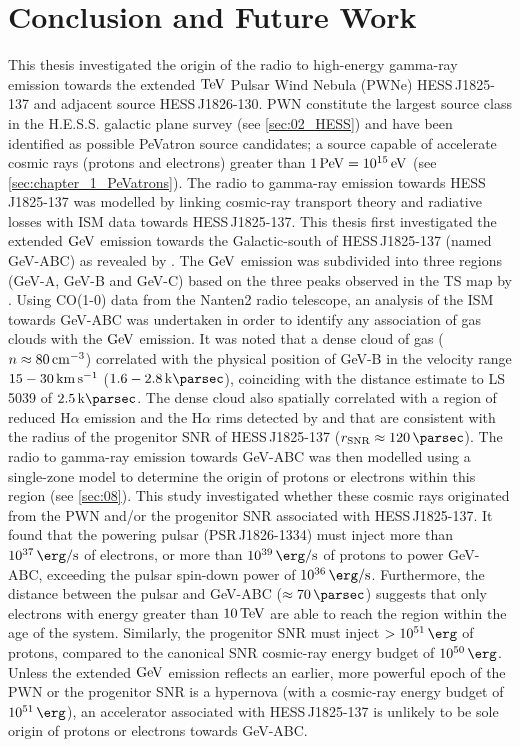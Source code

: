 \chapter{Conclusion and Future Work} \label{sec:10_summary}

This thesis investigated the origin of the radio to high-energy gamma-ray emission towards the extended $\TeV$ Pulsar Wind Nebula (PWNe) \mbox{HESS\,J1825-137} and adjacent source \mbox{HESS\,J1826-130}. PWN constitute the largest source class in the H.E.S.S. galactic plane survey (see \autoref{sec:02_HESS}) and have been identified as possible PeVatron source candidates; a source capable of accelerate cosmic rays (protons and electrons) greater than $1\,\PeV=10^{15}\,\eV$ (see \autoref{sec:chapter_1_PeVatrons}). The radio to gamma-ray emission towards \mbox{HESS\,J1825-137} was modelled by linking cosmic-ray transport theory and radiative losses with ISM data towards \mbox{HESS\,J1825-137}.
\newpar
This thesis first investigated the extended $\si{\giga\electronvolt}$ emission towards the Galactic-south of \mbox{HESS\,J1825-137} (named GeV-ABC) as revealed by \cite{2019MNRAS.485.1001A}. The $\si{\giga\electronvolt}$ emission was subdivided into three regions (GeV-A, GeV-B and GeV-C) based on the three peaks observed in the TS map by \cite{2019MNRAS.485.1001A}. Using CO(1-0) data from the Nanten2 radio telescope, an analysis of the ISM towards GeV-ABC was undertaken in order to identify any association of gas clouds with the $\si{\giga\electronvolt}$ emission. It was noted that a dense cloud of gas ($n\approx 80\,\si{\per\centi\meter\cubed}$) correlated with the physical position of GeV-B in the velocity range $15-30\,\si{\kilo\meter\per\second}$ ($1.6-2.8\,\kpc$), coinciding with the distance estimate to \mbox{LS\,5039} of $2.5\,\kpc$. The dense cloud also spatially correlated with a region of reduced H$\alpha$ emission and the H$\alpha$ rims detected by \cite{2008MNRAS.390.1037S} and \cite{2016MNRAS.458.2813V} that are consistent with the radius of the progenitor SNR of \mbox{HESS\,J1825-137} ($r_\text{SNR}\approx 120\,\pc$).
\newpar
The radio to gamma-ray emission towards \mbox{GeV-ABC} was then modelled using a single-zone model to determine the origin of protons or electrons within this region (see \autoref{sec:08}). This study investigated whether these cosmic rays originated from the PWN and/or the progenitor SNR associated with \mbox{HESS\,J1825-137}. It found that the powering pulsar (\mbox{PSR\,J1826-1334}) must inject more than {$10^{37}\,\ergspersec$} of electrons, or more than $10^{39}\,\ergspersec$ of protons to power \mbox{GeV-ABC}, exceeding the pulsar spin-down power of $10^{36}\,\ergspersec$. Furthermore, the distance between the pulsar and GeV-ABC ($\approx 70\,\pc$) suggests that only electrons with energy greater than $10\,\TeV$ are able to reach the region within the age of the system. Similarly, the progenitor SNR must inject $>10^{51}\,\ergs$ of protons, compared to the canonical SNR cosmic-ray energy budget of $10^{50}\,\ergs$. Unless the extended $\si{\giga\electronvolt}$ emission reflects an earlier, more powerful epoch of the PWN or the progenitor SNR is a hypernova (with a cosmic-ray energy budget of $10^{51}\,\ergs$), an accelerator associated with \mbox{HESS\,J1825-137} is unlikely to be sole origin of protons or electrons towards \mbox{GeV-ABC}.
